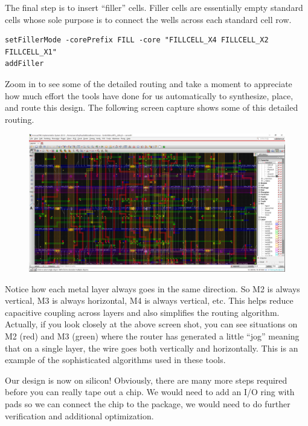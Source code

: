 \documentclass[a4paper,12pt,twoside]{article}
\begin{document}
The final step is to insert “filler” cells. Filler cells are essentially empty standard cells whose sole purpose is to connect the wells across each standard cell row.
\begin{verbatim}
setFillerMode -corePrefix FILL -core "FILLCELL_X4 FILLCELL_X2 FILLCELL_X1"
addFiller
\end{verbatim}
Zoom in to see some of the detailed routing and take a moment to appreciate how much effort the tools have done for us automatically to synthesize, place, and route this design. The following screen capture shows some of this detailed routing.
\begin{figure}[H]
    \centering
    \includegraphics[width=\textwidth]{images/18.png}
\end{figure}
Notice how each metal layer always goes in the same direction. So M2 is always vertical, M3 is always horizontal, M4 is always vertical, etc. This helps reduce capacitive coupling across layers and also simplifies the routing algorithm. Actually, if you look closely at the above screen shot, you can see situations on M2 (red) and M3 (green) where the router has generated a little “jog” meaning that on a single layer, the wire goes both vertically and horizontally. This is an example of the sophisticated algorithms used in these tools.

Our design is now on silicon! Obviously, there are many more steps required before you can really tape out a chip. We would need to add an I/O ring with pads so we can connect the chip to the package, we would need to do further verification and additional optimization.
\end{document}
